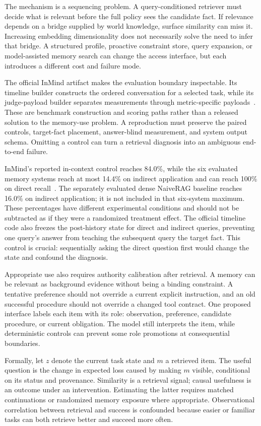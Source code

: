 The mechanism is a sequencing problem. A query-conditioned retriever must decide what is relevant before the full policy sees the candidate fact. If relevance depends on a bridge supplied by world knowledge, surface similarity can miss it. Increasing embedding dimensionality does not necessarily solve the need to infer that bridge. A structured profile, proactive constraint store, query expansion, or model-assisted memory search can change the access interface, but each introduces a different cost and failure mode.

The official InMind artifact makes the evaluation boundary inspectable. Its timeline builder constructs the ordered conversation for a selected task, while its judge-payload builder separates measurements through metric-specific payloads~\cite{repo_inmind2026}. These are benchmark construction and scoring paths rather than a released solution to the memory-use problem. A reproduction must preserve the paired controls, target-fact placement, answer-blind measurement, and system output schema. Omitting a control can turn a retrieval diagnosis into an ambiguous end-to-end failure.

InMind's reported in-context control reaches 84.0\%, while the six evaluated memory systems reach at most 14.4\% on indirect application and can reach 100\% on direct recall~\cite{inmind2026}. The separately evaluated dense NaiveRAG baseline reaches 16.0\% on indirect application; it is not included in that six-system maximum. These percentages have different experimental conditions and should not be subtracted as if they were a randomized treatment effect. The official timeline code also freezes the post-history state for direct and indirect queries, preventing one query's answer from teaching the subsequent query the target fact. This control is crucial: sequentially asking the direct question first would change the state and confound the diagnosis.

Appropriate use also requires authority calibration after retrieval. A memory can be relevant as background evidence without being a binding constraint. A tentative preference should not override a current explicit instruction, and an old successful procedure should not override a changed tool contract. One proposed interface labels each item with its role: observation, preference, candidate procedure, or current obligation. The model still interprets the item, while deterministic controls can prevent some role promotions at consequential boundaries.

Formally, let $z$ denote the current task state and $m$ a retrieved item. The useful question is the change in expected loss caused by making $m$ visible, conditional on its status and provenance. Similarity is a retrieval signal; causal usefulness is an outcome under an intervention. Estimating the latter requires matched continuations or randomized memory exposure where appropriate. Observational correlation between retrieval and success is confounded because easier or familiar tasks can both retrieve better and succeed more often.

